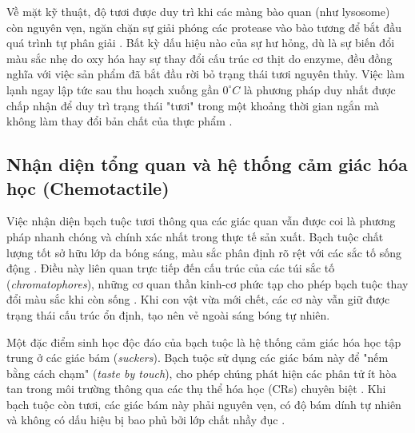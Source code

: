 \documentclass[12pt,a4paper]{report}
\begin{document}
Về mặt kỹ thuật, độ tươi được duy trì khi các màng bào quan (như lysosome) còn nguyên vẹn, ngăn chặn sự giải phóng các protease vào bào tương để bắt đầu quá trình tự phân giải \cite{agri_inst_ph}. Bất kỳ dấu hiệu nào của sự hư hỏng, dù là sự biến đổi màu sắc nhẹ do oxy hóa hay sự thay đổi cấu trúc cơ thịt do enzyme, đều đồng nghĩa với việc sản phẩm đã bắt đầu rời bỏ trạng thái tươi nguyên thủy. Việc làm lạnh ngay lập tức sau thu hoạch xuống gần $0^\circ C$ là phương pháp duy nhất được chấp nhận để duy trì trạng thái "tươi" trong một khoảng thời gian ngắn mà không làm thay đổi bản chất của thực phẩm \cite{dialnet_patagonian}.

\subsection{Nhận diện tổng quan và hệ thống cảm giác hóa học (Chemotactile)}

Việc nhận diện bạch tuộc tươi thông qua các giác quan vẫn được coi là phương pháp nhanh chóng và chính xác nhất trong thực tế sản xuất. Bạch tuộc chất lượng tốt sở hữu lớp da bóng sáng, màu sắc phân định rõ rệt với các sắc tố sống động \cite{pubmed_ice_storage}. Điều này liên quan trực tiếp đến cấu trúc của các túi sắc tố (\textit{chromatophores}), những cơ quan thần kinh-cơ phức tạp cho phép bạch tuộc thay đổi màu sắc khi còn sống \cite{pmc_color_change}. Khi con vật vừa mới chết, các cơ này vẫn giữ được trạng thái cấu trúc ổn định, tạo nên vẻ ngoài sáng bóng tự nhiên.

Một đặc điểm sinh học độc đáo của bạch tuộc là hệ thống cảm giác hóa học tập trung ở các giác bám (\textit{suckers}). Bạch tuộc sử dụng các giác bám này để "nếm bằng cách chạm" (\textit{taste by touch}), cho phép chúng phát hiện các phân tử ít hòa tan trong môi trường thông qua các thụ thể hóa học (CRs) chuyên biệt \cite{pmc_chemotactile}. Khi bạch tuộc còn tươi, các giác bám này phải nguyên vẹn, có độ bám dính tự nhiên và không có dấu hiệu bị bao phủ bởi lớp chất nhầy đục \cite{pmc_food_choice}.
\end{document}
